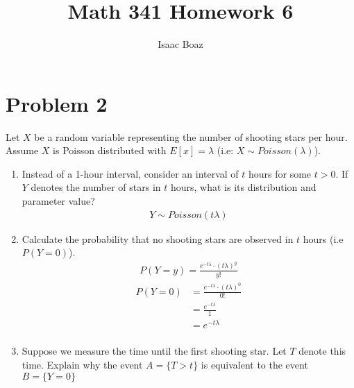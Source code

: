 \documentclass{article}
\title{\vspace{-4ex}Math 341 Homework 6}
\author{Isaac Boaz}
\begin{document}
\maketitle

\section*{Problem 2}

Let \(X\) be a random variable representing the number of shooting stars per hour. Assume \(X\) is Poisson distributed with \(E[x] = \lambda\) (i.e: \(X \sim Poisson(\lambda)\)).

\begin{enumerate}[label=\alph*)]
    \item Instead of a 1-hour interval, consider an interval of \(t\) hours for some \(t > 0\). If \(Y\) denotes the number of stars in \(t\) hours, what is its distribution and parameter value?
          \begin{align*}
              Y \sim Poisson(t\lambda)
          \end{align*}
    \item Calculate the probability that no shooting stars are observed in \(t\) hours (i.e \(P(Y = 0)\)).
          \begin{align*}
              P(Y = y) = \frac{e^{-t\lambda} \cdot (t\lambda)^y}{y!}
          \end{align*}
          \begin{align*}
              P(Y = 0) & = \frac{e^{-t\lambda} \cdot (t\lambda)^0}{0!} \\
                       & = \frac{e^{-t\lambda}}{1}                     \\
                       & = e^{-t\lambda}                               \\
          \end{align*}
    \item Suppose we measure the time until the first shooting star. Let \(T\) denote this time. Explain why the event \(A = \{T > t\}\) is equivalent to the event \(B = \{Y = 0\}\)
\end{enumerate}
\end{document}
